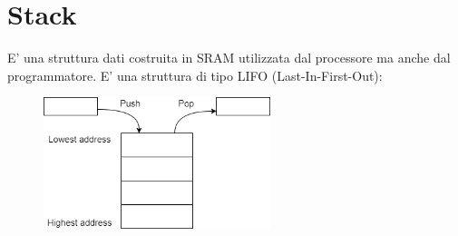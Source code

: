 \section{Stack}
E' una struttura dati costruita in SRAM utilizzata dal processore ma anche dal programmatore.
E' una struttura di tipo LIFO (Last-In-First-Out):
\begin{figure}[H]
    \centering
    \includegraphics[width=250px]{images/9_Stack/stack.png}
\end{figure}

